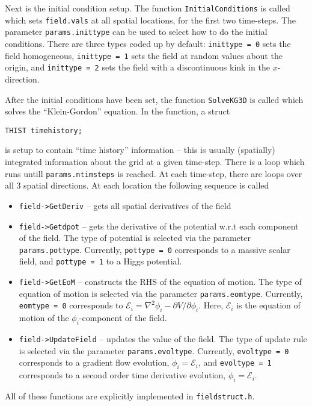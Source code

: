 \documentclass[amsmath,amssymb,12pt, eqsecnum]{revtex4}
\newcommand\codeRed[1]{\textcolor[rgb]{1,0,0}{{\tt #1}}}
\newcommand\codeBlue[1]{\textcolor[rgb]{0,0,1}{{\tt #1}}}
\begin{document}
Next is the initial condition setup. The function \codeBlue{InitialConditions} is called which sets {\tt field.vals} at all spatial locations, for the first two time-steps. The parameter {\tt params.inittype} can be used to select how to do the initial conditions. There are three types coded up by default: {\tt inittype = 0} sets the field homogeneous, {\tt inittype = 1} sets the field at random values about the origin, and {\tt inittype = 2} sets the field with a discontinuous kink in the $x$-direction.

After the initial conditions have been set, the function \codeBlue{SolveKG3D} is called which solves the ``Klein-Gordon'' equation. In the function, a struct
\begin{verbatim}
THIST timehistory;
\end{verbatim}
is setup to contain ``time history'' information -- this is usually (spatially) integrated information about the grid at a given time-step. There is a loop which runs untill {\tt params.ntimsteps} is reached. At each time-step, there are loops over all 3 spatial directions. At each location the following sequence is called
\begin{itemize}
\item \codeBlue{field->GetDeriv} -- gets all spatial derivatives of the field
\item \codeBlue{field->Getdpot} -- gets the derivative of the potential w.r.t each component of the field. The type of potential is selected via the parameter {\tt params.pottype}. Currently, {\tt pottype = 0} corresponds to a massive scalar field, and {\tt pottype = 1} to a Higgs potential.
\item \codeBlue{field->GetEoM} -- constructs the RHS of the equation of motion. The type of equation of motion is selected via the parameter {\tt params.eomtype}. Currently, {\tt eomtype = 0} corresponds to $\mathcal{E}_i = \nabla^2\phi_i -  {\partial V}/{\partial\phi_i}$. Here, $\mathcal{E}_i$ is the equation of motion of the $\phi_i$-component of the field.
\item \codeBlue{field->UpdateField} -- updates the value of the field. The type of update rule is selected via the parameter {\tt params.evoltype}. Currently, {\tt evoltype = 0} corresponds to a gradient flow evolution, $\dot{\phi}_i = \mathcal{E}_i$, and {\tt evoltype = 1} corresponds to a second order time derivative evolution, $\ddot{\phi}_i = \mathcal{E}_i$.
\end{itemize}
All of these functions are explicitly implemented in \codeRed{fieldstruct.h}.
\end{document}
